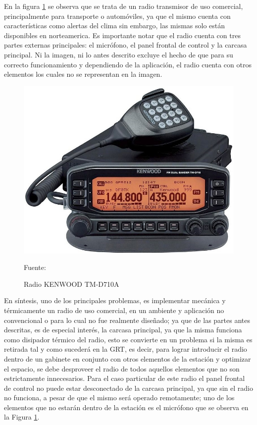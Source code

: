 En la figura \ref{fotoradio} se observa que se trata de un radio transmisor de uso comercial, principalmente para transporte o automóviles, ya que el mismo cuenta con características como alertas del clima sin embargo, las mismas solo están disponibles en norteamerica. Es importante notar que el radio cuenta con tres partes externas principales: el micrófono, el panel frontal de control y la carcasa principal. Ni la imagen, ni lo antes descrito excluye el hecho de que para su correcto funcionamiento y dependiendo de la aplicación, el radio cuenta con otros elementos los cuales no se representan en la imagen.

\begin{figure}[H]
\centering
\includegraphics[scale=0.5]{Figuras/radio.jpg}
\caption{Radio KENWOOD TM-D710A}
Fuente:\cite{fotoradio}
\label{fotoradio}
\end{figure}

En síntesis, uno de los principales problemas, es implementar mecánica y térmicamente un radio de uso comercial, en un ambiente y aplicación no convencional o para lo cual no fue realmente diseñado; ya que de las partes antes descritas, es de especial interés, la carcasa principal, ya que la misma funciona como disipador térmico del radio, esto se convierte en un problema si la misma es retirada tal y como sucederá en la GRT, es decir, para lograr introducir el radio dentro de un gabinete en conjunto con otros elementos de la estación y optimizar el espacio, se debe desproveer el radio de todos aquellos elementos que no son estrictamente innecesarios. Para el caso particular de este radio el panel frontal de control no puede estar desconectado de la carcasa principal, ya que sin el radio no funciona, a pesar de que el mismo será operado remotamente; uno de los elementos que no estarán dentro de la estación es el micrófono que se observa en la Figura \ref{fotoradio}. 

